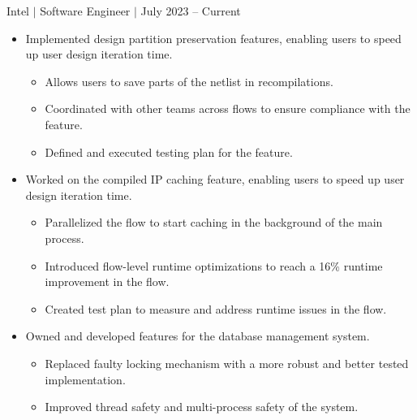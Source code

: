 \documentclass[12pt]{article}
\newcommand{\textDate}[3]{\noindent#1 $|$ #2 $|$ {\color{textGray} #3}}
\begin{document}
    \textDate{Intel}{Software Engineer}{July 2023 -- Current}
    \begin{small}
        \begin{itemize}
            \itemsep0em 

            \item {\color{textGray} Implemented design partition preservation features, enabling users to speed up user design iteration time.}
                \begin{itemize}[label=$\circ$,topsep=-5px,partopsep=0px]
                    \itemsep0em 
                    \item {\color{textGray} Allows users to save parts of the netlist in recompilations.}
                    \item {\color{textGray} Coordinated with other teams across flows to ensure compliance with the feature.}
                    \item {\color{textGray} Defined and executed testing plan for the feature.}
                \end{itemize}

            \item {\color{textGray} Worked on the compiled IP caching feature, enabling users to speed up user design iteration time.}
                \begin{itemize}[label=$\circ$,topsep=-5px,partopsep=0px]
                    \itemsep0em 
                    \item {\color{textGray} Parallelized the flow to start caching in the background of the main process.}
                    \item {\color{textGray} Introduced flow-level runtime optimizations to reach a 16\% runtime improvement in the flow.}
                    \item {\color{textGray} Created test plan to measure and address runtime issues in the flow.}
                \end{itemize}

            \item {\color{textGray} Owned and developed features for the database management system.}
                \begin{itemize}[label=$\circ$,topsep=-5px,partopsep=0px]
                    \itemsep0em 
                    \item {\color{textGray} Replaced faulty locking mechanism with a more robust and better tested implementation.}
                    \item {\color{textGray} Improved thread safety and multi-process safety of the system.}
                \end{itemize}


\end{itemize}
\end{small}
\end{document}
